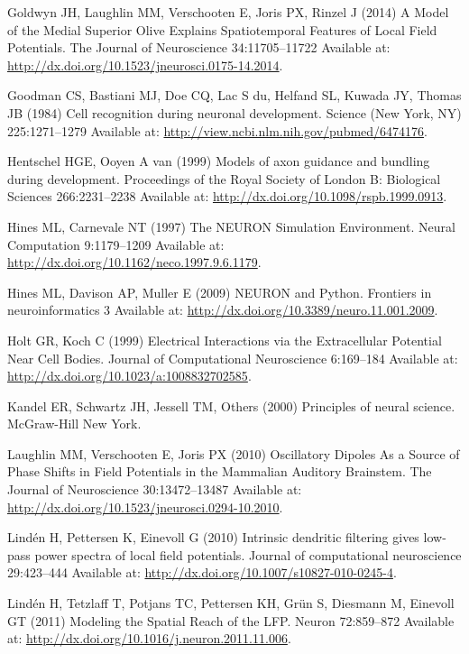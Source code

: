 \documentclass[]{article}
\begin{document}
\hypertarget{ref-Goldwyn2014Model}{}
Goldwyn JH, Laughlin MM, Verschooten E, Joris PX, Rinzel J (2014) A
Model of the Medial Superior Olive Explains Spatiotemporal Features of
Local Field Potentials. The Journal of Neuroscience 34:11705--11722
Available at: \url{http://dx.doi.org/10.1523/jneurosci.0175-14.2014}.

\hypertarget{ref-Goodman1984Cell}{}
Goodman CS, Bastiani MJ, Doe CQ, Lac S du, Helfand SL, Kuwada JY, Thomas
JB (1984) Cell recognition during neuronal development. Science (New
York, NY) 225:1271--1279 Available at:
\url{http://view.ncbi.nlm.nih.gov/pubmed/6474176}.

\hypertarget{ref-Hentschel1999Models}{}
Hentschel HGE, Ooyen A van (1999) Models of axon guidance and bundling
during development. Proceedings of the Royal Society of London B:
Biological Sciences 266:2231--2238 Available at:
\url{http://dx.doi.org/10.1098/rspb.1999.0913}.

\hypertarget{ref-Hines1997NEURON}{}
Hines ML, Carnevale NT (1997) The NEURON Simulation Environment. Neural
Computation 9:1179--1209 Available at:
\url{http://dx.doi.org/10.1162/neco.1997.9.6.1179}.

\hypertarget{ref-Hines2009NEURON}{}
Hines ML, Davison AP, Muller E (2009) NEURON and Python. Frontiers in
neuroinformatics 3 Available at:
\url{http://dx.doi.org/10.3389/neuro.11.001.2009}.

\hypertarget{ref-Holt1999Electrical}{}
Holt GR, Koch C (1999) Electrical Interactions via the Extracellular
Potential Near Cell Bodies. Journal of Computational Neuroscience
6:169--184 Available at:
\url{http://dx.doi.org/10.1023/a:1008832702585}.

\hypertarget{ref-kandel2000principles}{}
Kandel ER, Schwartz JH, Jessell TM, Others (2000) Principles of neural
science. McGraw-Hill New York.

\hypertarget{ref-Laughlin2010Oscillatory}{}
Laughlin MM, Verschooten E, Joris PX (2010) Oscillatory Dipoles As a
Source of Phase Shifts in Field Potentials in the Mammalian Auditory
Brainstem. The Journal of Neuroscience 30:13472--13487 Available at:
\url{http://dx.doi.org/10.1523/jneurosci.0294-10.2010}.

\hypertarget{ref-Linden2010Intrinsic}{}
Lindén H, Pettersen K, Einevoll G (2010) Intrinsic dendritic filtering
gives low-pass power spectra of local field potentials. Journal of
computational neuroscience 29:423--444 Available at:
\url{http://dx.doi.org/10.1007/s10827-010-0245-4}.

\hypertarget{ref-Linden2011Modeling}{}
Lindén H, Tetzlaff T, Potjans TC, Pettersen KH, Grün S, Diesmann M,
Einevoll GT (2011) Modeling the Spatial Reach of the LFP. Neuron
72:859--872 Available at:
\url{http://dx.doi.org/10.1016/j.neuron.2011.11.006}.
\end{document}
